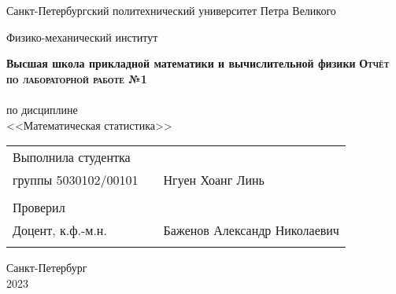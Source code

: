 \documentclass[a4paper]{article}
\begin{document}
\begin{titlepage}
  \begin{center}
    \large
    Санкт-Петербургский политехнический университет Петра Великого
    
    Физико-механический институт
    
    \textbf{Высшая школа прикладной математики и вычислительной физики}
    \vfill
    \textsc{\textbf{\Large{Отчёт по лабораторной работе №1}}}\\[5mm]
    \\ по дисциплине\\ <<Математическая статистика>>\\
\end{center}

\vfill

\begin{tabular}{l p{} l}
Выполнила студентка \\группы 5030102/00101 && Нгуен Хоанг Линь \\
\\
Проверил\\Доцент, к.ф.-м.н.& \hspace{0pt} &   Баженов Александр Николаевич \\\\
\end{tabular}

\hfill \break
\hfill \break
\begin{center} Санкт-Петербург \\2023 \end{center}
\thispagestyle{empty}
\end{titlepage}
\newpage
\newpage
\begin{center}
    \setcounter{page}{2}
    \tableofcontents
\end{center}
\newpage
\begin{center}
    \setcounter{page}{3}
    \listoffigures
\end{center}
\newpage
\end{document}
